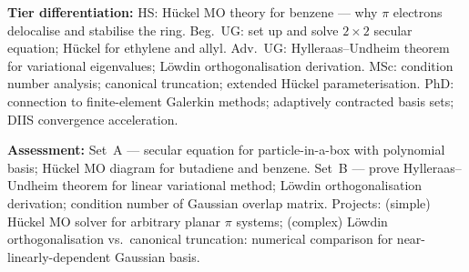 \documentclass[11pt,a4paper]{article}
\begin{document}
\begin{tcolorbox}[modulebox, title={Module~II.1 --- Lecture L02: The Linear Variational Method}]
\medskip\textbf{Tier differentiation:}
HS: H\"uckel MO theory for benzene --- why $\pi$ electrons delocalise and stabilise the ring.
Beg.\ UG: set up and solve $2\times 2$ secular equation; H\"uckel for ethylene and allyl.
Adv.\ UG: Hylleraas--Undheim theorem for variational eigenvalues; L\"owdin orthogonalisation derivation.
MSc: condition number analysis; canonical truncation; extended H\"uckel parameterisation.
PhD: connection to finite-element Galerkin methods; adaptively contracted basis sets;
DIIS convergence acceleration.

\medskip\textbf{Assessment:}
Set~A --- secular equation for particle-in-a-box with polynomial basis;
H\"uckel MO diagram for butadiene and benzene.
Set~B --- prove Hylleraas--Undheim theorem for linear variational method;
L\"owdin orthogonalisation derivation; condition number of Gaussian overlap matrix.
Projects: (simple) H\"uckel MO solver for arbitrary planar $\pi$ systems;
(complex) L\"owdin orthogonalisation vs.\ canonical truncation: numerical comparison
for near-linearly-dependent Gaussian basis.
\end{tcolorbox}

\medskip
\end{document}
